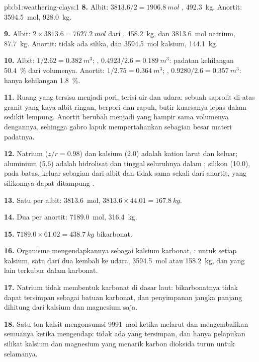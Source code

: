 \begin{solution}{pb:b1:weathering-clays:1}
\textbf{8.} Albit: $3813.6/2 = \qty{1906.8}{mol}$ ,
\qty{492.3}{kg}. Anortit: \qty{3594.5}{mol}, \qty{928.0}{kg}.

\textbf{9.} Albit: $2\times3813.6 = \qty{7627.2}{mol}$ dari ,
\qty{458.2}{kg}, dan \qty{3813.6}{mol} natrium, \qty{87.7}{kg}. Anortit:
tidak ada silika, dan \qty{3594.5}{mol} kalsium, \qty{144.1}{kg}.

\textbf{10.} Albit: $1/2.62 = \qty{0.382}{m^3}$; ,
$0.4923/2.6 = \qty{0.189}{m^3}$: padatan kehilangan \qty{50.4}{\percent} dari
volumenya. Anortit: $1/2.75 = \qty{0.364}{m^3}$; ,
$0.9280/2.6 = \qty{0.357}{m^3}$: hanya kehilangan \qty{1.8}{\percent}.

\textbf{11.} Ruang yang tersisa menjadi pori, terisi air dan udara: sebuah
saprolit di atas granit yang kaya albit ringan, berpori dan rapuh, butir kuarsanya
lepas dalam sedikit lempung. Anortit berubah menjadi  yang hampir sama
volumenya dengannya, sehingga gabro lapuk mempertahankan sebagian besar materi padatnya.

\textbf{12.} Natrium ($z/r = 0.98$) dan kalsium (2.0) adalah kation larut dan
keluar; aluminium (5.6) adalah hidrolisat dan tinggal seluruhnya dalam ;
silikon (10.0), pada batas, keluar sebagian dari albit dan tidak sama sekali
dari anortit, yang silikonnya dapat ditampung .

\textbf{13.} Satu  per albit: \qty{3813.6}{mol}, $3813.6 \times 44.01 =
\qty{167.8}{kg}$.

\textbf{14.} Dua per anortit: \qty{7189.0}{mol}, \qty{316.4}{kg}.

\textbf{15.} $7189.0 \times 61.02 = \qty{438.7}{kg}$ bikarbonat.

\textbf{16.} Organisme mengendapkannya sebagai kalsium karbonat,
: untuk setiap kalsium, satu dari dua
 kembali ke udara, \qty{3594.5}{mol} atau \qty{158.2}{kg}, dan yang
lain terkubur dalam karbonat.

\textbf{17.} Natrium tidak membentuk karbonat di dasar laut: bikarbonatnya tidak
dapat tersimpan sebagai batuan karbonat, dan penyimpanan jangka panjang dihitung
dari kalsium dan magnesium saja.

\textbf{18.} Satu ton kalsit mengonsumsi \qty{9991}{mol}  ketika melarut
dan mengembalikan semuanya ketika mengendap: tidak ada yang tersimpan, dan hanya
pelapukan silikat kalsium dan magnesium yang menarik karbon dioksida turun untuk selamanya.


\end{solution}
